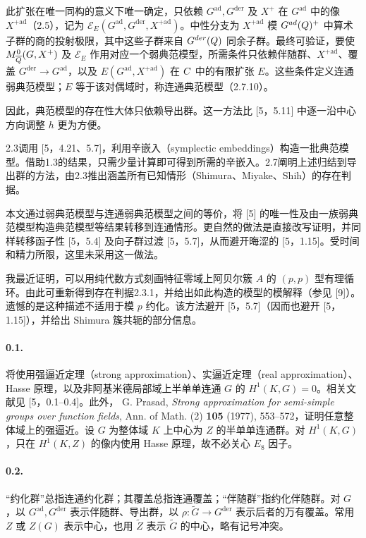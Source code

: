 此扩张在唯一同构的意义下唯一确定，只依赖 $G^{\mathrm{ad}},G^{\mathrm{der}}$ 及 $X^+$ 在 $G^{\mathrm{ad}}$ 中的像 $X^{+\mathrm{ad}}$（2.5），记为 $\mathcal E_E(G^{\mathrm{ad}},G^{\mathrm{der}},X^{+\mathrm{ad}})$。中性分支为 $X^{+\mathrm{ad}}$ 模 $G^{ad}(Q)^+$ 中算术子群的商的投射极限，其中这些子群来自 $G^{der}(Q)$ 同余子群。最终可验证，要使 $M_{\overline{Q}}^0(G,X^+)$ 及 $\mathcal E_E$ 作用对应一个弱典范模型，所需条件只依赖伴随群、$X^{+\mathrm{ad}}$、覆盖 $G^{\mathrm{der}}\to G^{\mathrm{ad}}$，以及 $E(G^{\mathrm{ad}},X^{+\mathrm{ad}})$ 在 $C$ 中的有限扩张 $E$。这些条件定义连通弱典范模型；$E$ 等于该对偶域时，称连通典范模型（2.7.10）。

因此，典范模型的存在性大体只依赖导出群。这一方法比 [5，5.11] 中逐一沿中心方向调整 $h$ 更为方便。

2.3调用 [5，4.21、5.7]，利用辛嵌入（symplectic embeddings）构造一批典范模型。借助1.3的结果，只需少量计算即可得到所需的辛嵌入。2.7阐明上述归结到导出群的方法，由2.3推出涵盖所有已知情形（Shimura、Miyake、Shih）的存在判据。

本文通过弱典范模型与连通弱典范模型之间的等价，将 [5] 的唯一性及由一族弱典范模型构造典范模型等结果转移到连通情形。更自然的做法是直接改写证明，并同样转移函子性 [5，5.4] 及向子群过渡 [5，5.7]，从而避开晦涩的 [5，1.15]。受时间和精力所限，这里未采用这一做法。

我最近证明，可以用纯代数方式刻画特征零域上阿贝尔簇 $A$ 的 $(p,p)$ 型有理循环。由此可重新得到存在判据2.3.1，并给出如此构造的模型的模解释（参见 [9]）。遗憾的是这种描述不适用于模 $p$ 约化。该方法避开 [5，5.7]（因而也避开 [5，1.15]），并给出 Shimura 簇共轭的部分信息。

\paragraph*{0.1.} 将使用强逼近定理（strong approximation）、实逼近定理（real approximation）、Hasse 原理，以及非阿基米德局部域上半单单连通 $G$ 的 $H^1(K,G)=0$。相关文献见 [5，0.1--0.4]。此外， G. Prasad, \textit{Strong approximation for semi-simple groups over function fields}, Ann. of Math. (2) \textbf{105} (1977), 553--572，证明任意整体域上的强逼近。设 $G$ 为整体域 $K$ 上中心为 $Z$ 的半单单连通群。对 $H^1(K,G)$，只在 $H^1(K,Z)$ 的像内使用 Hasse 原理，故不必关心 $E_8$ 因子。
\paragraph*{0.2.} “约化群”总指连通约化群；其覆盖总指连通覆盖；“伴随群”指约化伴随群。对 $G$，以 $G^{\mathrm{ad}},G^{\mathrm{der}}$ 表示伴随群、导出群，以 $\rho:\widetilde G\to G^{\mathrm{der}}$ 表示后者的万有覆盖。常用 $Z$ 或 $Z(G)$ 表示中心，也用 $\widetilde Z$ 表示 $\widetilde G$ 的中心，略有记号冲突。
